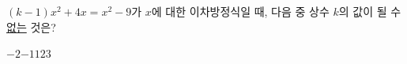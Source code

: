 $(k-1)x^2+4x=x^2-9$가 $x$에 대한 이차방정식일 때, 다음 중 상수 $k$의 값이 될 수 \underline{없는} 것은?
\begin{choices32}{$-2$}{$-1$}{$1$}{$2$}{$3$}\end{choices32}
